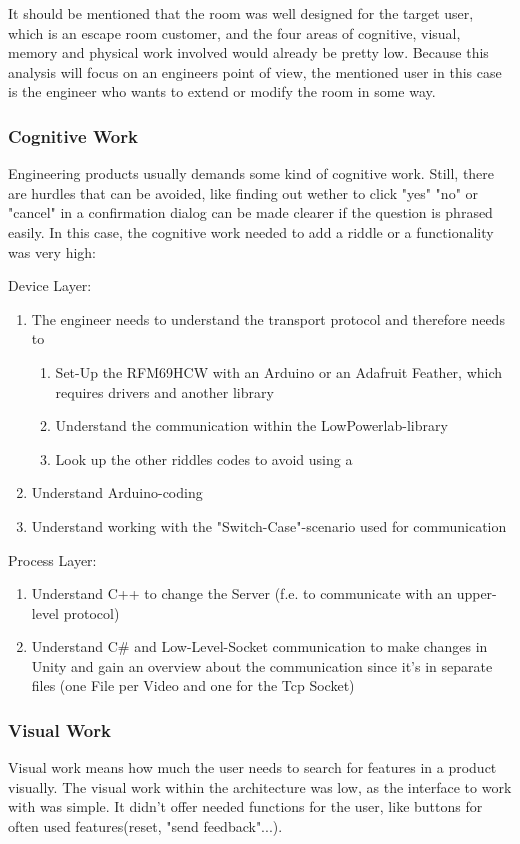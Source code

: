 It should be mentioned that the room was well designed for the target user, which is an escape room customer, and 
the four areas of cognitive, visual, memory and physical work involved would already be pretty low.
Because this analysis will focus on an engineers point of view, the mentioned user in this case is the engineer who wants to extend or modify the room in some way.

\subsubsection{Cognitive Work}
Engineering products usually demands some kind of cognitive work. Still, there are hurdles that can be avoided,
like finding out wether to click "yes" "no" or "cancel" in a confirmation dialog can be made clearer if the question is phrased easily.
In this case, the cognitive work needed to add a riddle or a functionality was very high:

Device Layer:
\begin{enumerate}
    \item The engineer needs to understand the transport protocol and therefore needs to 
    \begin{enumerate}
        \item Set-Up the RFM69HCW with an Arduino or an Adafruit Feather, which requires drivers and another library
        \item Understand the communication within the LowPowerlab-library
        \item Look up the other riddles codes to avoid using a %
    \end{enumerate}   
    \item Understand Arduino-coding 
    \item Understand working with the "Switch-Case"-scenario used for communication 
\end{enumerate}  

Process Layer:
\begin{enumerate}
    \item Understand C++ to change the Server (f.e. to communicate with an upper-level protocol)
    \item Understand C\# and Low-Level-Socket communication to make changes in Unity 
    and gain an overview about the communication since it's in separate files (one File per Video and one for the Tcp Socket) 
\end{enumerate}  

\subsubsection{Visual Work}
Visual work means how much the user needs to search for features in a product visually.
The visual work within the architecture was low, as the interface to work with was simple.
It didn't offer needed functions for the user, like buttons for often used features(reset, "send feedback"...).

